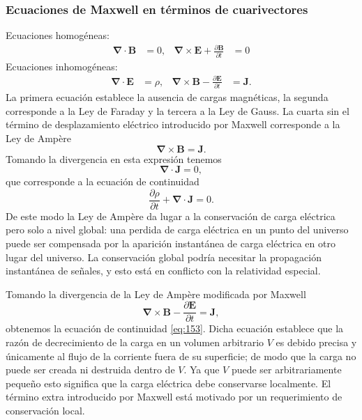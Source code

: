 \subsubsection{Ecuaciones de Maxwell en términos de cuarivectores}

Ecuaciones homogéneas:
\begin{align}
  \label{eq:hom_m_eq}
  \boldsymbol{\nabla}\cdot\mathbf{B}&=0,&\boldsymbol{\nabla}\times\mathbf{E}+\frac{\partial\mathbf{B}}{\partial t}&=0
\end{align}
Ecuaciones inhomogéneas:
\begin{align}
  \label{eq:inhom_m_eq}
  \boldsymbol{\nabla}\cdot\mathbf{E}&=\rho,&\boldsymbol{\nabla}\times\mathbf{B}-\frac{\partial\mathbf{E}}{\partial t}&=\mathbf{J}.
\end{align}
La primera ecuación establece la ausencia de cargas magnéticas, la segunda corresponde a la Ley de Faraday y la tercera a la Ley de Gauss. La cuarta sin el término de desplazamiento eléctrico introducido por Maxwell corresponde a la Ley de Ampère
\begin{equation}
   \boldsymbol{\nabla}\times\mathbf{B}=\mathbf{J}.
\end{equation}
Tomando la divergencia en esta expresión tenemos
\begin{equation}
  \boldsymbol{\nabla}\cdot\mathbf{J}=0,
\end{equation}
que corresponde a la ecuación de continuidad
\begin{equation}
  \label{eq:153}
  \frac{\partial \rho}{\partial t}+\boldsymbol{\nabla}\cdot\mathbf{J}=0.
\end{equation}
De este modo la Ley de Ampère da lugar a la conservación de carga eléctrica pero solo a nivel global:  una perdida de carga eléctrica en un punto del universo puede ser compensada por la aparición instantánea de carga eléctrica en otro lugar del universo. La conservación global podría necesitar la propagación instantánea de señales, y esto está en conflicto con la relatividad especial.


Tomando la divergencia de la Ley de Amp\`ere modificada por Maxwell
\begin{equation}
   \boldsymbol{\nabla}\times\mathbf{B}-\frac{\partial\mathbf{E}}{\partial t}=\mathbf{J},
\end{equation}
obtenemos la ecuación de continuidad \eqref{eq:153}. Dicha ecuación establece que la razón de decrecimiento de la carga en un volumen arbitrario $V$ es debido precisa y únicamente al flujo de la corriente fuera de su superficie; de modo que la carga no puede ser creada ni destruida dentro de $V$.  Ya que $V$ puede ser arbitrariamente pequeño esto significa que la carga eléctrica debe conservarse localmente.   El término extra introducido por Maxwell está motivado por un requerimiento de conservación local. 

